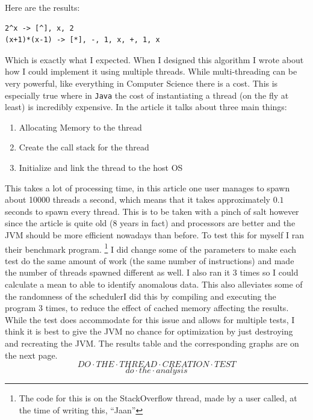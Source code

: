 \documentclass[../../../../../main.tex]{subfiles}
\begin{document}
Here are the results:
\begin{verbatim}
2^x -> [^], x, 2
(x+1)*(x-1) -> [*], -, 1, x, +, 1, x
\end{verbatim}
Which is exactly what I expected.
\newpage \noindent
When I designed this algorithm I wrote about how I could implement it using multiple threads. While multi-threading can be very powerful, like everything in Computer Science there is a cost. This is especially true where in \texttt{Java} the cost of instantiating a thread\cite{threadCreationJava} (on the fly at least) is incredibly expensive. In the article it talks about three main things:
\begin{enumerate}
\item Allocating Memory to the thread
\item Create the call stack for the thread\cite{threadStackJava, callStack}
\item Initialize and link the thread to the host OS
\end{enumerate}
This takes a lot of processing time, in this article\cite{threadCreationRate} one user manages to spawn about 10000 threads a second, which means that it takes approximately $0.1$ seconds to spawn every thread. This is to be taken with a pinch of salt however since the article is quite old (8 years in fact) and processors are better and the JVM should be more efficient nowadays than before. To test this for myself I ran their benchmark program.
\footnote{The code for this is on the StackOverflow thread, made by a user called, at the time of writing this, ``Jaan''\cite{threadCreationRate}} 
I did change some of the parameters to make each test do the same amount of work (the same number of instructions) and made the number of threads spawned different as well. I also ran it 3 times so I could calculate a mean to able to identify anomalous data. This also alleviates some of the randomness of the schedulerI did this by compiling and executing the program 3 times, to reduce the effect of cached memory affecting the results. While the test does accommodate for this issue and allows for multiple tests, I think it is best to give the JVM no chance for optimization by just destroying and recreating the JVM. The results table and the corresponding graphs are on the next page.
\[DO \cdot THE \cdot THREAD \cdot CREATION \cdot TEST\]
\[do \cdot the \cdot analysis\]
\end{document}
